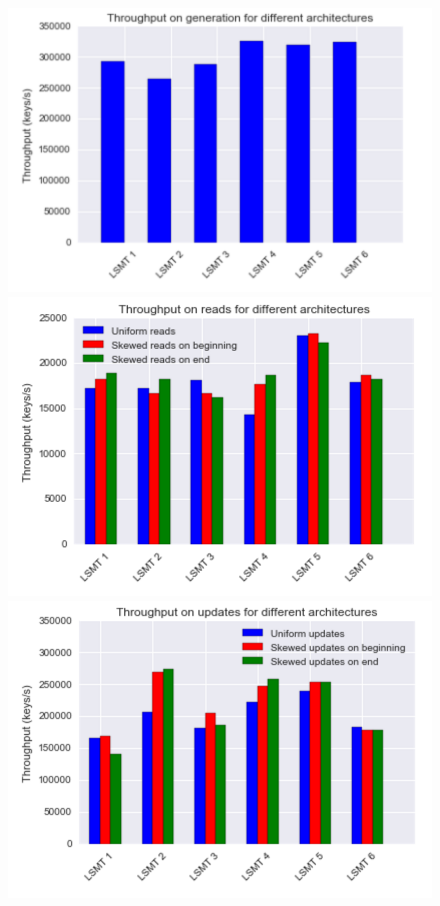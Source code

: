 \documentclass{sig-alternate-05-2015}
\begin{document}
\begin{figure}

  \begin{minipage}[b]{0.32\textwidth}
    \includegraphics[width=\textwidth]{img/archi_generation}
  \end{minipage}
  \hfill
  \begin{minipage}[b]{0.32\textwidth}
    \includegraphics[width=\textwidth]{img/archi_reads}
  \end{minipage}
  \hfill
  \begin{minipage}[b]{0.32\textwidth}
    \includegraphics[width=\textwidth]{img/archi_udpates}

\end{minipage}
\end{figure}
\end{document}

